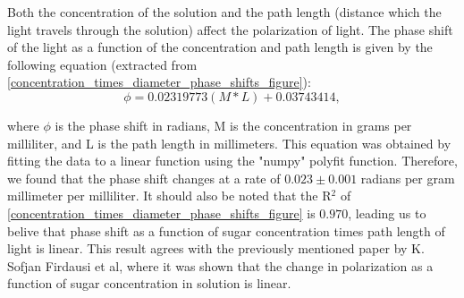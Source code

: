 

Both the concentration of the solution and the path length (distance which the light travels through the solution) affect the polarization of light. The phase shift of the light as a function of the concentration and path length is given by the following equation (extracted from \cref{concentration_times_diameter_phase_shifts_figure}):
\begin{equation}
\phi = 0.02319773(M*L) + 0.03743414,
\end{equation}

where $\phi$ is the phase shift in radians, M is the concentration in grams per milliliter, and L is the path length in millimeters. This equation was obtained by fitting the data to a linear function using the "numpy" polyfit function. Therefore, we found that the phase shift changes at a rate of $0.023 \pm 0.001$ radians per gram millimeter per milliliter. It should also be noted that the R$^2$ of \cref{concentration_times_diameter_phase_shifts_figure} is $0.970$, leading us to belive that phase shift as a function of sugar concentration times path length of light is linear. This result agrees with the previously mentioned paper by K. Sofjan Firdausi et al, where it was shown that the change in polarization as a function of sugar concentration in solution is linear\cite{Firsdausi2018}.

